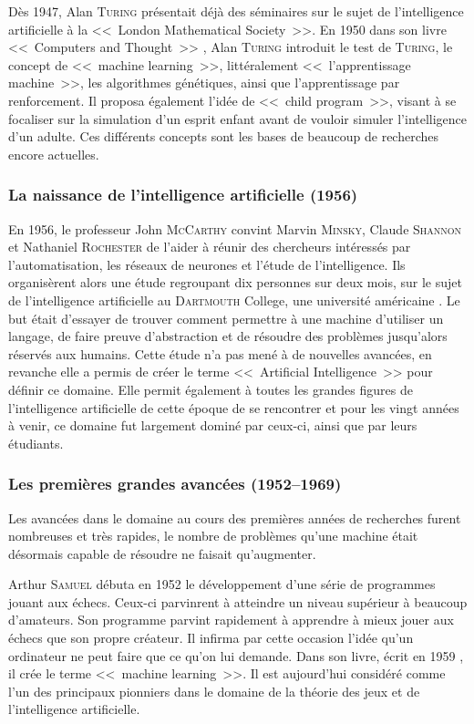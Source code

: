 Dès 1947, Alan \textsc{Turing} présentait déjà des séminaires sur le sujet de l'intelligence artificielle à la <<~London Mathematical Society~>>.
En 1950 dans son livre <<~Computers and Thought~>> \cite{computer_and_thought}, Alan \textsc{Turing} introduit le test de \textsc{Turing}, le concept de <<~machine learning~>>, littéralement <<~l'apprentissage machine~>>, les algorithmes génétiques, ainsi que l'apprentissage par renforcement.
Il proposa également l'idée de <<~child program~>>, visant à se focaliser sur la simulation d'un esprit enfant avant de vouloir simuler l'intelligence d'un adulte.
Ces différents concepts sont les bases de beaucoup de recherches encore actuelles.

\subsubsection{La naissance de l'intelligence artificielle (1956)}

En 1956, le professeur John \textsc{McCarthy} convint Marvin \textsc{Minsky}, Claude \textsc{Shannon} et Nathaniel \textsc{Rochester} de l'aider à réunir des chercheurs intéressés par l'automatisation, les réseaux de neurones et l'étude de l'intelligence.
Ils organisèrent alors une étude regroupant dix personnes sur deux mois, sur le sujet de l'intelligence artificielle au \textsc{Dartmouth} College, une université américaine \cite{modern_approach}.
Le but était d'essayer de trouver comment permettre à une machine d'utiliser un langage, de faire preuve d'abstraction et de résoudre des problèmes jusqu'alors réservés aux humains.
Cette étude n'a pas mené à de nouvelles avancées, en revanche elle a permis de créer le terme <<~Artificial Intelligence~>> pour définir ce domaine.
Elle permit également à toutes les grandes figures de l'intelligence artificielle de cette époque de se rencontrer et pour les vingt années à venir, ce domaine fut largement dominé par ceux-ci, ainsi que par leurs étudiants.

\subsubsection{Les premières grandes avancées (1952–1969)}

Les avancées dans le domaine au cours des premières années de recherches furent nombreuses et très rapides, le nombre de problèmes qu'une machine était désormais capable de résoudre ne faisait qu'augmenter.

Arthur \textsc{Samuel} débuta en 1952 le développement d'une série de programmes jouant aux échecs.
Ceux-ci parvinrent à atteindre un niveau supérieur à beaucoup d'amateurs.
Son programme parvint rapidement à apprendre à mieux jouer aux échecs que son propre créateur.
Il infirma par cette occasion l'idée qu'un ordinateur ne peut faire que ce qu'on lui demande.
Dans son livre, écrit en 1959 \cite{Samuel_1959}, il crée le terme <<~machine learning~>>.
Il est aujourd'hui considéré comme l'un des principaux pionniers dans le domaine de la théorie des jeux et de l'intelligence artificielle.

